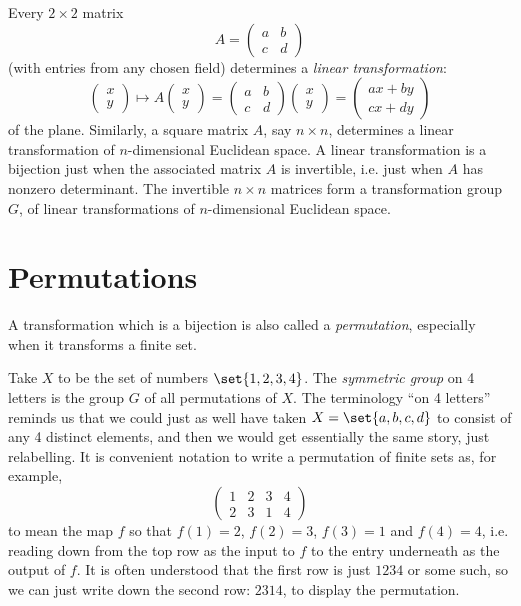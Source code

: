 \begin{example}
Every \(2 \times 2\) matrix 
\[
A=
\begin{pmatrix}
a & b \\
c & d
\end{pmatrix}
\]
(with entries from any chosen field) determines a \emph{linear transformation}:
\[
\begin{pmatrix}
x \\
y
\end{pmatrix}
\mapsto
A
\begin{pmatrix}
x \\
y
\end{pmatrix}
=
\begin{pmatrix}
a & b \\
c & d
\end{pmatrix}
\begin{pmatrix}
x \\
y
\end{pmatrix}
=
\begin{pmatrix}
ax + by \\
cx + dy
\end{pmatrix}
\]
of the plane.
Similarly, a square matrix \(A\), say \(n \times n\), determines a linear transformation of \(n\)-dimensional Euclidean space.
A linear transformation is a bijection just when the associated matrix \(A\) is invertible, i.e. just when \(A\) has nonzero determinant.
The invertible \(n \times n\) matrices form a transformation group \(G\), of linear transformations of \(n\)-dimensional Euclidean space.
\end{example}



\section{Permutations}
A transformation which is a bijection is also called a \emph{permutation}, especially when it transforms a finite set.
\begin{example}
Take \(X\) to be the set of numbers \(\set{1,2,3,4}\).
The \emph{symmetric group} on 4 letters is the group \(G\) of all permutations of \(X\).
The terminology ``on 4 letters'' reminds us that we could just as well have taken \(X=\set{a,b,c,d}\) to consist of any 4 distinct elements, and then we would get essentially the same story, just relabelling.
It is convenient notation to write a permutation of finite sets as, for example,
\[
\begin{pmatrix}
1 & 2 & 3 & 4 \\
2 & 3 & 1 & 4
\end{pmatrix}
\]
to mean the map \(f\) so that \(f(1)=2\), \(f(2)=3\), \(f(3)=1\) and \(f(4)=4\), i.e. reading down from the top row as the input to \(f\) to the entry underneath as the output of \(f\).
It is often understood that the first row is just \(1234\) or some such, so we can just write down the second row: \(2314\), to display the permutation.
\end{example}

